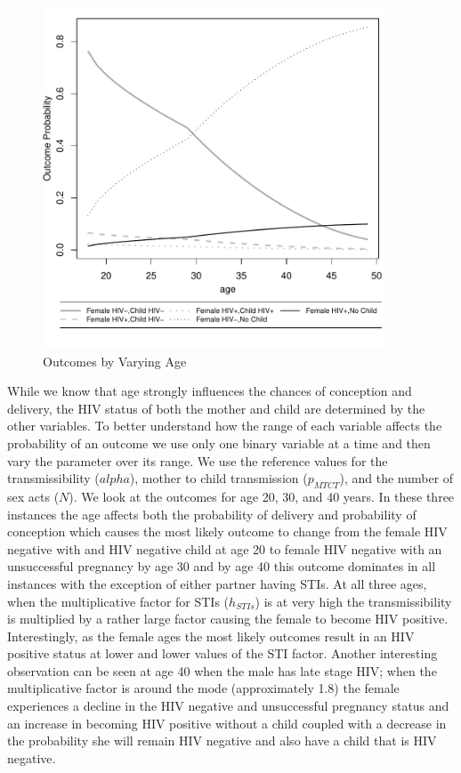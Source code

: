 \documentclass[11pt]{nih_mod}
\begin{document}
\begin{figure}[!h]
  \begin{center}
    \includegraphics[width=4in]{figures/AgeVary_07Sept2012.pdf}
  \end{center}
  \caption{Outcomes by Varying Age}
  \label{Fig:AgeVary}
\end{figure}

While we know that age strongly influences the chances of conception and delivery, the HIV status of both the mother and child are determined by the other variables.  To better understand how the range of each variable affects the probability of an outcome we use only one binary variable at a time and then vary the parameter over its range.  We use the reference values for the transmissibility ($alpha$), mother to child transmission ($p_{MTCT}$), and the number of sex acts ($N$).  We look at the outcomes for age 20, 30, and 40 years.  In these three instances the age affects both the probability of delivery and probability of conception which causes the most likely outcome to change from the female HIV negative with and HIV negative child at age 20 to female HIV negative with an unsuccessful pregnancy by age 30 and by age 40 this outcome dominates in all instances with the exception of either partner having STIs.  At all three ages, when the multiplicative factor for STIs ($h_{STIs}$) is at very high the transmissibility is multiplied by a rather large factor causing the female to become HIV positive.  Interestingly, as the female ages the most likely outcomes result in an HIV positive status at lower and lower values of the STI factor.  Another interesting observation can be seen at age 40 when the male has late stage HIV; when the multiplicative factor is around the mode (approximately 1.8) the female experiences a decline in the HIV negative and unsuccessful pregnancy status and an increase in becoming HIV positive without a child coupled with a decrease in the probability she will remain HIV negative and also have a child that is HIV negative. 
\end{document}
